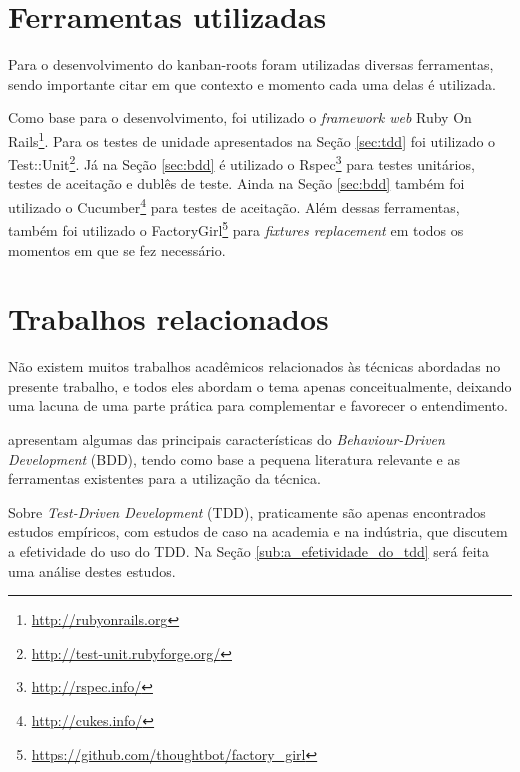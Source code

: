 \section{Ferramentas utilizadas}

Para o desenvolvimento do kanban-roots foram utilizadas diversas ferramentas, sendo importante citar em que contexto e momento cada uma delas é utilizada.

Como base para o desenvolvimento, foi utilizado o \textit{framework web} Ruby On Rails\footnote{\url{http://rubyonrails.org}}. Para os testes de unidade apresentados na Seção \ref{sec:tdd} foi utilizado o Test::Unit\footnote{\url{http://test-unit.rubyforge.org/}}. Já na Seção \ref{sec:bdd} é utilizado o Rspec\footnote{\url{http://rspec.info/}} para testes unitários, testes de aceitação e dublês de teste. Ainda na Seção \ref{sec:bdd} também foi utilizado o Cucumber\footnote{\url{http://cukes.info/}} para testes de aceitação. Além dessas ferramentas, também foi utilizado o FactoryGirl\footnote{\url{https://github.com/thoughtbot/factory_girl}} para \textit{fixtures replacement} em todos os momentos em que se fez necessário.

\section{Trabalhos relacionados} %
\label{sec:trabalhos_relacionados}

Não existem muitos trabalhos acadêmicos relacionados às técnicas abordadas no presente trabalho, e todos eles abordam o tema apenas conceitualmente, deixando uma lacuna de uma parte prática para complementar e favorecer o entendimento.

 apresentam algumas das principais características do \textit{Behaviour-Driven Development} (BDD), tendo como base a pequena literatura relevante e as ferramentas existentes para a utilização da técnica.

Sobre \textit{Test-Driven Development} (TDD), praticamente são apenas encontrados estudos empíricos, com estudos de caso na academia e na indústria, que discutem a efetividade do uso do TDD. Na Seção \ref{sub:a_efetividade_do_tdd} será feita uma análise destes estudos.

